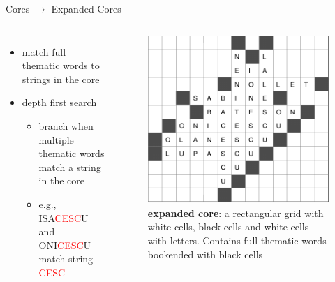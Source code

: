 \documentclass[aspectratio=169,usenames,dvipsnames]{beamer}
\newcommand{\bei}{\begin{itemize}}
\newcommand{\eei}{\end{itemize}}
\newcommand{\ie}{\item}
\numberwithin{equation}{section}
\numberwithin{theorem}{section}
\numberwithin{lem}{section}
\numberwithin{df}{section}
\begin{document}


\begin{frame}{Cores $\to$ Expanded Cores}

\begin{columns}

\bei
\ie match full thematic words to strings in the core

\medskip

\ie depth first search
\bei
\ie branch when multiple thematic words match a string in the core
\ie e.g., ISA\textcolor{red}{CESC}U and ONI\textcolor{red}{CESC}U match string \textcolor{red}{CESC}
\eei
\eei


\begin{figure}
\includegraphics[width=0.9\columnwidth]{_plots/extcore-alive-0-puzzle-72-2975-1488--1--1.pdf}
\caption{{\bf expanded core}: a rectangular grid with white cells, black cells and white cells with letters. Contains full thematic words bookended with black cells}
\end{figure}

\end{columns}

\end{frame}

\end{document}
